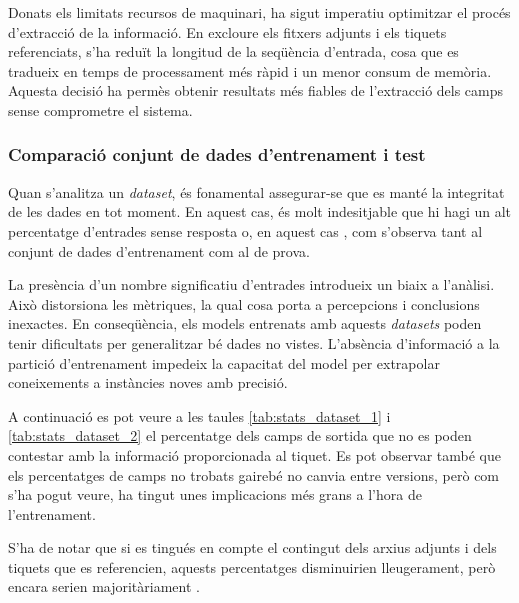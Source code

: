 Donats els limitats recursos de maquinari, ha sigut imperatiu optimitzar el procés d'extracció de la informació. En excloure els fitxers adjunts i els tiquets referenciats, s'ha reduït la longitud de la seqüència d'entrada, cosa que es tradueix en temps de processament més ràpid i un menor consum de memòria. Aquesta decisió ha permès obtenir resultats més fiables de l'extracció dels camps sense comprometre el sistema.

\subsubsection{Comparació conjunt de dades d'entrenament i test}
Quan s'analitza un \textit{dataset}, és fonamental assegurar-se que es manté la integritat de les dades en tot moment. En aquest cas, és molt indesitjable que hi hagi un alt percentatge d'entrades sense resposta o, en aquest cas , com s'observa tant al conjunt de dades d'entrenament com al de prova.

La presència d'un nombre significatiu d'entrades  introdueix un biaix a l'anàlisi. Això distorsiona les mètriques, la qual cosa porta a percepcions i conclusions inexactes. En conseqüència, els models entrenats amb aquests \textit{datasets} poden tenir dificultats per generalitzar bé dades no vistes. L'absència d'informació a la partició d'entrenament impedeix la capacitat del model per extrapolar coneixements a instàncies noves amb precisió.

A continuació es pot veure a les taules \ref{tab:stats_dataset_1} i \ref{tab:stats_dataset_2} el percentatge dels camps de sortida que no es poden contestar amb la informació proporcionada al tiquet. Es pot observar també que els percentatges de camps no trobats gairebé no canvia entre versions, però com s'ha pogut veure, ha tingut unes implicacions més grans a l'hora de l'entrenament.

S'ha de notar que si es tingués en compte el contingut dels arxius adjunts i dels tiquets que es referencien, aquests percentatges disminuirien lleugerament, però encara serien majoritàriament .


